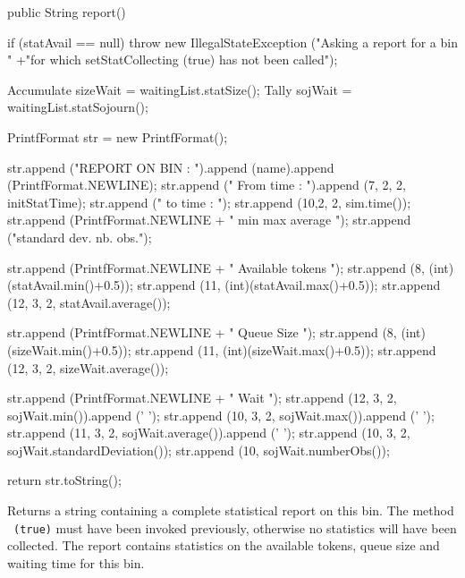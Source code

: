 \begin{code}

   public String report() \begin{hide} {

    if (statAvail == null) throw new IllegalStateException ("Asking a report for a bin "
                          +"for which setStatCollecting (true) has not been called");

    Accumulate sizeWait = waitingList.statSize();
    Tally sojWait = waitingList.statSojourn();

    PrintfFormat str = new PrintfFormat();

    str.append ("REPORT ON BIN : ").append (name).append (PrintfFormat.NEWLINE);
    str.append ("   From time : ").append (7, 2, 2, initStatTime);
    str.append ("   to time : ");
    str.append (10,2, 2, sim.time());
    str.append (PrintfFormat.NEWLINE + "                    min        max     average  ");
    str.append ("standard dev.  nb. obs.");

    str.append (PrintfFormat.NEWLINE + "   Available tokens ");
    str.append (8, (int)(statAvail.min()+0.5));
    str.append (11, (int)(statAvail.max()+0.5));
    str.append (12, 3, 2, statAvail.average());

    str.append (PrintfFormat.NEWLINE + "   Queue Size  ");
    str.append (8, (int)(sizeWait.min()+0.5));
    str.append (11, (int)(sizeWait.max()+0.5));
    str.append (12, 3, 2, sizeWait.average());

    str.append (PrintfFormat.NEWLINE + "   Wait    ");
    str.append (12, 3, 2, sojWait.min()).append (' ');
    str.append (10, 3, 2, sojWait.max()).append (' ');
    str.append (11, 3, 2, sojWait.average()).append (' ');
    str.append (10, 3, 2, sojWait.standardDeviation());
    str.append (10, sojWait.numberObs());

    return str.toString();
   }\end{hide}
\end{code}
 \begin{tabb}  Returns a string containing a complete statistical report on
  this  bin. The method \\ ~\texttt{(true)} must have
  been invoked previously, otherwise no statistics will have been collected.
  The report contains statistics on the available tokens, queue size and
  waiting time for this bin.
 \end{tabb}
\begin{htmlonly}
\end{htmlonly}

